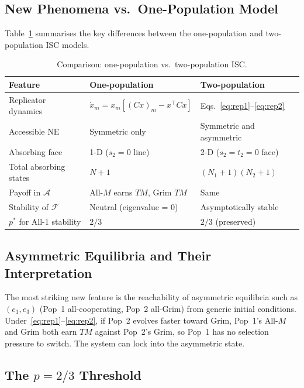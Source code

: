 \documentclass[12pt,a4paper]{article}
\begin{document}
\subsection{New Phenomena vs.\ One-Population Model}

Table~\ref{tab:compare} summarises the key differences between the
one-population and two-population ISC models.

\begin{table}[H]
\centering
\caption{Comparison: one-population vs.\ two-population ISC.}
\label{tab:compare}
\small
\renewcommand{\arraystretch}{1.2}
\begin{tabular}{lll}
\toprule
Feature & One-population & Two-population \\
\midrule
Replicator dynamics   & $\dot x_m=x_m[(Cx)_m-x^\top Cx]$ &
                        Eqs.~\eqref{eq:rep1}--\eqref{eq:rep2} \\
Accessible NE         & Symmetric only & Symmetric and asymmetric \\
Absorbing face        & 1-D ($s_2=0$ line) & 2-D ($s_2=t_2=0$ face) \\
Total absorbing states & $N+1$ & $(N_1+1)(N_2+1)$ \\
Payoff in $\mathcal{A}$ & All-$M$ earns $TM$, Grim $TM$ & Same \\
Stability of $\mathcal{F}$ & Neutral (eigenvalue = 0) & Asymptotically stable \\
$p^*$ for All-$1$ stability & $2/3$ & $2/3$ (preserved) \\
\bottomrule
\end{tabular}
\end{table}

\subsection{Asymmetric Equilibria and Their Interpretation}

The most striking new feature is the reachability of asymmetric equilibria such
as $(e_1,e_3)$ (Pop~1 all-cooperating, Pop~2 all-Grim) from generic initial
conditions.  Under~\eqref{eq:rep1}--\eqref{eq:rep2}, if Pop~2 evolves faster
toward Grim, Pop~1's All-$M$ and Grim both earn $TM$ against Pop~2's Grim,
so Pop~1 has no selection pressure to switch.  The system can lock into the
asymmetric state.

\subsection{The $p=2/3$ Threshold}
\end{document}
